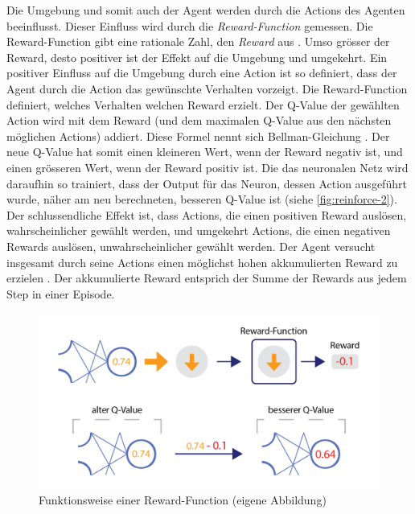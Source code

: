 Die Umgebung und somit auch der Agent werden durch die Actions des Agenten
beeinflusst. Dieser Einfluss wird durch die \emph{Reward-Function} gemessen. Die
Reward-Function gibt eine rationale Zahl, den \emph{Reward} aus \cite[S.
75]{sutton_reinforcement_2014}. Umso grösser der Reward, desto positiver ist der
Effekt auf die Umgebung und umgekehrt. Ein positiver Einfluss auf die Umgebung
durch eine Action ist so definiert, dass der Agent durch die Action das
gewünschte Verhalten vorzeigt. Die Reward-Function definiert, welches Verhalten
welchen Reward erzielt. Der Q-Value der gewählten Action wird mit dem Reward
(und dem maximalen Q-Value aus den nächsten möglichen Actions) addiert. Diese
Formel nennt sich Bellman-Gleichung \cite[S. 3]{mnih_playing_2013}. Der neue
Q-Value hat somit einen kleineren Wert, wenn der Reward negativ ist, und einen
grösseren Wert, wenn der Reward positiv ist. Die das neuronalen Netz wird
daraufhin so trainiert, dass der Output für das Neuron, dessen Action ausgeführt
wurde, näher am neu berechneten, besseren Q-Value ist (siehe \autoref{fig:reinforce-2}).
Der schlussendliche Effekt ist, dass Actions, die einen positiven Reward
auslösen, wahrscheinlicher gewählt werden, und umgekehrt Actions, die einen
negativen Rewards auslösen, unwahrscheinlicher gewählt werden. Der Agent
versucht insgesamt durch seine Actions einen möglichst hohen akkumulierten
Reward zu erzielen \cite[S. 57]{sutton_reinforcement_2014}. Der akkumulierte
Reward entsprich der Summe der Rewards aus jedem Step in einer Episode.

\begin{figure}[!ht]
    \centering
    \includegraphics[width=\textwidth]{images/theorie/reinforce-2.png}
    \caption{Funktionsweise einer Reward-Function (eigene Abbildung)}
    \label{fig:reinforce-2}
\end{figure}

